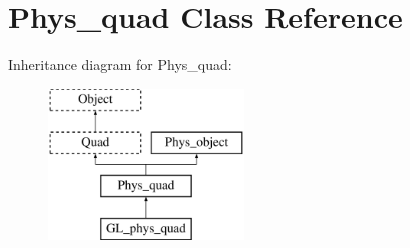 \hypertarget{class_phys__quad}{
\section{Phys\_\-quad Class Reference}
\label{class_phys__quad}
}
Inheritance diagram for Phys\_\-quad:\begin{figure}[H]
\begin{center}
\leavevmode
\includegraphics[height=4.000000cm]{class_phys__quad}
\end{center}
\end{figure}
